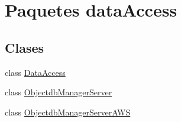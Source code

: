 \hypertarget{namespacedataAccess}{}\section{Paquetes data\+Access}
\label{namespacedataAccess}
\subsection*{Clases}
\begin{DoxyCompactItemize}
\item 
class \mbox{\hyperlink{classdataAccess_1_1DataAccess}{Data\+Access}}
\item 
class \mbox{\hyperlink{classdataAccess_1_1ObjectdbManagerServer}{Objectdb\+Manager\+Server}}
\item 
class \mbox{\hyperlink{classdataAccess_1_1ObjectdbManagerServerAWS}{Objectdb\+Manager\+Server\+A\+WS}}
\end{DoxyCompactItemize}
